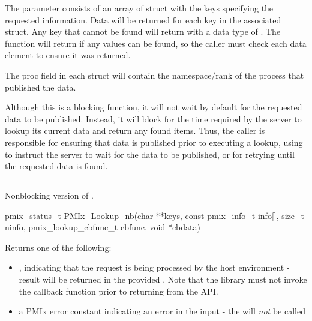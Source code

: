 The  parameter consists of an array of  struct with the keys specifying the requested information.
Data will be returned for each key in the associated  struct.
Any key that cannot be found will return with a data type of .
The function will return  if any values can be found, so the caller must check each data element to ensure it was returned.

The proc field in each  struct will contain the namespace/rank of the process that published the data.

\adviceuserstart
Although this is a blocking function, it will not wait by default for the requested data to be published.
Instead, it will block for the time required by the server to lookup its current data and return any found items.
Thus, the caller is responsible for ensuring that data is published prior to executing a lookup, using  to instruct the server to wait for the data to be published, or for retrying until the requested data is found.
\adviceuserend

\subsection{}

\summary

Nonblocking version of .

\format

\cspecificstart
\begin{codepar}
pmix_status_t
PMIx_Lookup_nb(char **keys,
               const pmix_info_t info[], size_t ninfo,
               pmix_lookup_cbfunc_t cbfunc, void *cbdata)
\end{codepar}
\cspecificend

\begin{arglist}
\end{arglist}

Returns one of the following:

\begin{itemize}
    \item {}, indicating that the request is being processed by the host environment - result will be returned in the provided . Note that the library must not invoke the callback function prior to returning from the \ac{API}.
    \item a PMIx error constant indicating an error in the input - the  will \textit{not} be called
\end{itemize}


